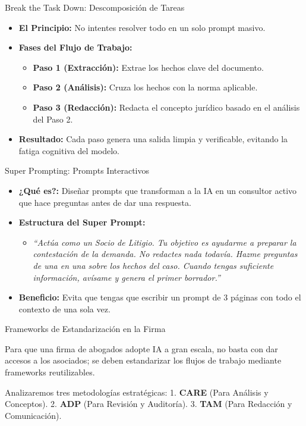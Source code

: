 \documentclass[aspectratio=169]{beamer}
\begin{document}
\begin{frame}[fragile]{Break the Task Down: Descomposición de Tareas}


\begin{itemize}
  \item \textbf{El Principio:} No intentes resolver todo en un solo prompt masivo.
  \item \textbf{Fases del Flujo de Trabajo:}
  \begin{itemize}
    \item \textbf{Paso 1 (Extracción):} Extrae los hechos clave del documento.
    \item \textbf{Paso 2 (Análisis):} Cruza los hechos con la norma aplicable.
    \item \textbf{Paso 3 (Redacción):} Redacta el concepto jurídico basado en el análisis del Paso 2.
  \end{itemize}
  \item \textbf{Resultado:} Cada paso genera una salida limpia y verificable, evitando la fatiga cognitiva del modelo.
\end{itemize}
\end{frame}



\begin{frame}[fragile]{Super Prompting: Prompts Interactivos}


\begin{itemize}
  \item \textbf{¿Qué es?:} Diseñar prompts que transforman a la IA en un consultor activo que hace preguntas antes de dar una respuesta.
  \item \textbf{Estructura del Super Prompt:}
  \begin{itemize}
    \item \textit{``Actúa como un Socio de Litigio. Tu objetivo es ayudarme a preparar la contestación de la demanda. No redactes nada todavía. Hazme preguntas de una en una sobre los hechos del caso. Cuando tengas suficiente información, avísame y genera el primer borrador.''}
  \end{itemize}
  \item \textbf{Beneficio:} Evita que tengas que escribir un prompt de 3 páginas con todo el contexto de una sola vez.
\end{itemize}
\end{frame}



\begin{frame}[fragile]{Frameworks de Estandarización en la Firma}


Para que una firma de abogados adopte IA a gran escala, no basta con dar accesos a los asociados; se deben estandarizar los flujos de trabajo mediante frameworks reutilizables.

Analizaremos tres metodologías estratégicas:
1. \textbf{CARE} (Para Análisis y Conceptos).
2. \textbf{ADP} (Para Revisión y Auditoría).
3. \textbf{TAM} (Para Redacción y Comunicación).

\end{frame}
\end{document}
